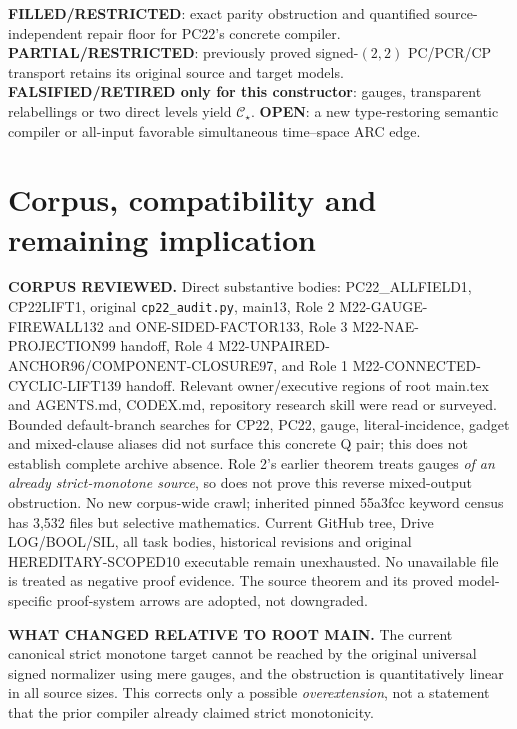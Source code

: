 \documentclass[11pt]{article}
\begin{document}
\textbf{FILLED/RESTRICTED}: exact parity obstruction and quantified source-independent repair floor for PC22's concrete compiler. \textbf{PARTIAL/RESTRICTED}: previously proved signed-$(2,2)$ PC/PCR/CP transport retains its original source and target models. \textbf{FALSIFIED/RETIRED only for this constructor}: gauges, transparent relabellings or two direct levels yield $\mathcal C_\star$. \textbf{OPEN}: a new type-restoring semantic compiler or all-input favorable simultaneous time--space ARC edge.

\section{Corpus, compatibility and remaining implication}
\textbf{CORPUS REVIEWED.} Direct substantive bodies: PC22\_ALLFIELD1, CP22LIFT1, original \texttt{cp22\_audit.py}, main13, Role 2 M22-GAUGE-FIREWALL132 and ONE-SIDED-FACTOR133, Role 3 M22-NAE-PROJECTION99 handoff, Role 4 M22-UNPAIRED-ANCHOR96/COMPONENT-CLOSURE97, and Role 1 M22-CONNECTED-CYCLIC-LIFT139 handoff. Relevant owner/executive regions of root main.tex and AGENTS.md, CODEX.md, repository research skill were read or surveyed. Bounded default-branch searches for CP22, PC22, gauge, literal-incidence, gadget and mixed-clause aliases did not surface this concrete Q pair; this does not establish complete archive absence. Role 2's earlier theorem treats gauges \emph{of an already strict-monotone source}, so does not prove this reverse mixed-output obstruction. No new corpus-wide crawl; inherited pinned 55a3fcc keyword census has 3,532 files but selective mathematics. Current GitHub tree, Drive LOG/BOOL/SIL, all task bodies, historical revisions and original HEREDITARY-SCOPED10 executable remain unexhausted. No unavailable file is treated as negative proof evidence. The source theorem and its proved model-specific proof-system arrows are adopted, not downgraded.

\textbf{WHAT CHANGED RELATIVE TO ROOT MAIN.} The current canonical strict monotone target cannot be reached by the original universal signed normalizer using mere gauges, and the obstruction is quantitatively linear in all source sizes. This corrects only a possible \emph{overextension}, not a statement that the prior compiler already claimed strict monotonicity.
\end{document}
